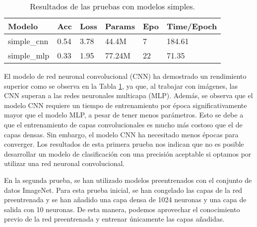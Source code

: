 \documentclass[10pt,a4paper,twocolumn,twoside]{article}
\begin{document}
\begin{table}[h]
  \centering
  \begin{tabular}{@{}llllll@{}}
    \toprule
    \textbf{Modelo} & \textbf{Acc} & \textbf{Loss} & \textbf{Params} & \textbf{Epo} & \textbf{Time/Epoch} \\
    \midrule
    simple\_cnn & 0.54 & 3.78 & 44.4M & 7 & 184.61 \\
    simple\_mlp & 0.33 & 1.95 & 77.24M & 22 & 71.35 \\
    \bottomrule
  \end{tabular}
  \caption{Resultados de las pruebas con modelos simples.}
  \label{table:simple_models}
\end{table}

El modelo de red neuronal convolucional (CNN) ha demostrado un rendimiento superior como se observa en la Tabla \ref{table:simple_models}, ya que, al trabajar con imágenes, las CNN superan a las redes neuronales multicapa (MLP). Además, se observa que el modelo CNN requiere un tiempo de entrenamiento por época significativamente mayor que el modelo MLP, a pesar de tener menos parámetros. Esto se debe a que el entrenamiento de capas convolucionales es mucho más costoso que el de capas densas. Sin embargo, el modelo CNN ha necesitado menos épocas para converger. Los resultados de esta primera prueba nos indican que no es posible desarrollar un modelo de clasificación con una precisión aceptable si optamos por utilizar una red neuronal convolucional.

En la segunda prueba, se han utilizado modelos preentrenados con el conjunto de datos ImageNet. Para esta prueba inicial, se han congelado las capas de la red preentrenada y se han añadido una capa densa de 1024 neuronas y una capa de salida con 10 neuronas. De esta manera, podemos aprovechar el conocimiento previo de la red preentrenada y entrenar únicamente las capas añadidas.
\end{document}

